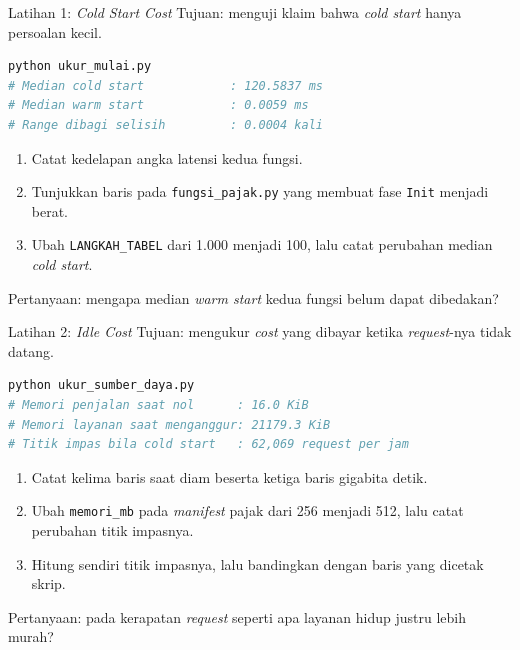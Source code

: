 \documentclass[aspectratio=169, table, 12pt]{beamer}
\begin{document}
\begin{frame}[fragile]{{\Large Latihan 1: \textit{Cold Start Cost}}}
  \vspace{8pt}
  {\small Tujuan: menguji klaim bahwa \textit{cold start} hanya persoalan
  kecil.}
  \vspace{2pt}
\begin{lstlisting}[language=bash]
python ukur_mulai.py
# Median cold start            : 120.5837 ms
# Median warm start            : 0.0059 ms
# Range dibagi selisih         : 0.0004 kali
\end{lstlisting}
  \begin{enumerate}\small
    \item Catat kedelapan angka latensi kedua fungsi.
    \item Tunjukkan baris pada \texttt{fungsi\_pajak.py} yang membuat fase
          \texttt{Init} menjadi berat.
    \item Ubah \texttt{LANGKAH\_TABEL} dari 1.000 menjadi 100, lalu catat
          perubahan median \textit{cold start}.
  \end{enumerate}
  {\small Pertanyaan: mengapa median \textit{warm start} kedua fungsi belum
  dapat dibedakan?}
\end{frame}

\begin{frame}[fragile]{{\Large Latihan 2: \textit{Idle Cost}}}
  \vspace{8pt}
  {\small Tujuan: mengukur \textit{cost} yang dibayar ketika
  \textit{request}-nya tidak datang.}
  \vspace{2pt}
\begin{lstlisting}[language=bash]
python ukur_sumber_daya.py
# Memori penjalan saat nol      : 16.0 KiB
# Memori layanan saat menganggur: 21179.3 KiB
# Titik impas bila cold start   : 62,069 request per jam
\end{lstlisting}
  \begin{enumerate}\small
    \item Catat kelima baris saat diam beserta ketiga baris gigabita detik.
    \item Ubah \texttt{memori\_mb} pada \textit{manifest} pajak dari 256
          menjadi 512, lalu catat perubahan titik impasnya.
    \item Hitung sendiri titik impasnya, lalu bandingkan dengan baris yang
          dicetak skrip.
  \end{enumerate}
  {\small Pertanyaan: pada kerapatan \textit{request} seperti apa layanan hidup
  justru lebih murah?}
\end{frame}
\end{document}
